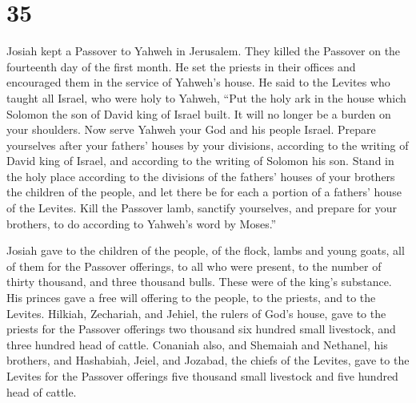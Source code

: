 \hypertarget{section-34}{%
\section{35}\label{section-34}}

 Josiah kept a Passover to Yahweh in Jerusalem. They killed
the Passover on the fourteenth day of the first month.  He
set the priests in their offices and encouraged them in the service of
Yahweh's house.  He said to the Levites who taught all
Israel, who were holy to Yahweh, ``Put the holy ark in the house which
Solomon the son of David king of Israel built. It will no longer be a
burden on your shoulders. Now serve Yahweh your God and his people
Israel.  Prepare yourselves after your fathers' houses by
your divisions, according to the writing of David king of Israel, and
according to the writing of Solomon his son.  Stand in the
holy place according to the divisions of the fathers' houses of your
brothers the children of the people, and let there be for each a portion
of a fathers' house of the Levites.  Kill the Passover lamb,
sanctify yourselves, and prepare for your brothers, to do according to
Yahweh's word by Moses.''

 Josiah gave to the children of the people, of the flock,
lambs and young goats, all of them for the Passover offerings, to all
who were present, to the number of thirty thousand, and three thousand
bulls. These were of the king's substance.  His princes gave
a free will offering to the people, to the priests, and to the Levites.
Hilkiah, Zechariah, and Jehiel, the rulers of God's house, gave to the
priests for the Passover offerings two thousand six hundred small
livestock, and three hundred head of cattle.  Conaniah also,
and Shemaiah and Nethanel, his brothers, and Hashabiah, Jeiel, and
Jozabad, the chiefs of the Levites, gave to the Levites for the Passover
offerings five thousand small livestock and five hundred head of cattle.

